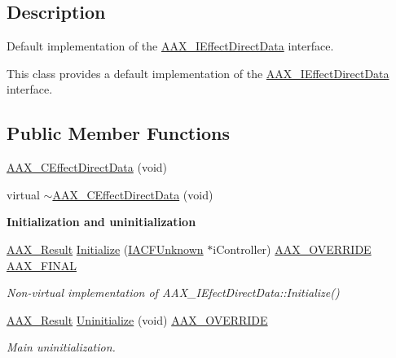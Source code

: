 \subsection{Description}
Default implementation of the \mbox{\hyperlink{a01817}{A\+A\+X\+\_\+\+I\+Effect\+Direct\+Data}} interface. 

This class provides a default implementation of the \mbox{\hyperlink{a01817}{A\+A\+X\+\_\+\+I\+Effect\+Direct\+Data}} interface. \subsection*{Public Member Functions}
\begin{DoxyCompactItemize}
\item 
\mbox{\hyperlink{a01473_a4a3e96ae0ad1f0be1813b27657f66fd9}{A\+A\+X\+\_\+\+C\+Effect\+Direct\+Data}} (void)
\item 
virtual \mbox{\hyperlink{a01473_a8dd2b1e2a6464cd59319047185e4e899}{$\sim$\+A\+A\+X\+\_\+\+C\+Effect\+Direct\+Data}} (void)
\end{DoxyCompactItemize}
\begin{Indent}\textbf{ Initialization and uninitialization}\par
\begin{DoxyCompactItemize}
\item 
\mbox{\hyperlink{a00392_a4d8f69a697df7f70c3a8e9b8ee130d2f}{A\+A\+X\+\_\+\+Result}} \mbox{\hyperlink{a01473_ad89ee93781539d8df3b0710a186c7e0d}{Initialize}} (\mbox{\hyperlink{a01409}{I\+A\+C\+F\+Unknown}} $\ast$i\+Controller) \mbox{\hyperlink{a00392_ac2f24a5172689ae684344abdcce55463}{A\+A\+X\+\_\+\+O\+V\+E\+R\+R\+I\+DE}} \mbox{\hyperlink{a00392_aa4da4a09e940c332a2205e34e0677f40}{A\+A\+X\+\_\+\+F\+I\+N\+AL}}
\begin{DoxyCompactList}\small\item\em Non-\/virtual implementation of A\+A\+X\+\_\+\+I\+Efect\+Direct\+Data\+::\+Initialize() \end{DoxyCompactList}\item 
\mbox{\hyperlink{a00392_a4d8f69a697df7f70c3a8e9b8ee130d2f}{A\+A\+X\+\_\+\+Result}} \mbox{\hyperlink{a01473_a49f02465aa623666f9e43a8646d9e56c}{Uninitialize}} (void) \mbox{\hyperlink{a00392_ac2f24a5172689ae684344abdcce55463}{A\+A\+X\+\_\+\+O\+V\+E\+R\+R\+I\+DE}}
\begin{DoxyCompactList}\small\item\em Main uninitialization. \end{DoxyCompactList}\end{DoxyCompactItemize}
\end{Indent}
